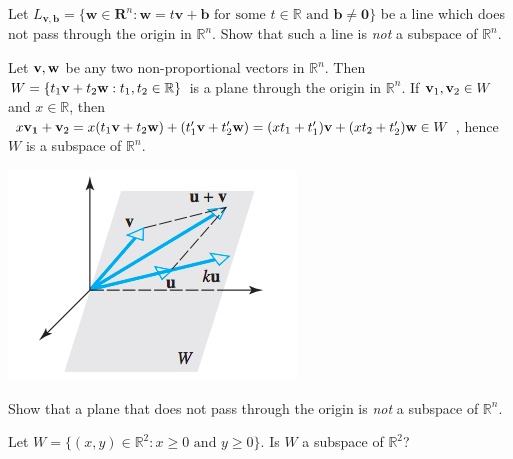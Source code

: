 \documentclass[12pt,letterpaper,reqno]{article}
\numberwithin{equation}{section}
\begin{document}
\begin{exercise}
	Let $L_{\mathbf{v},\mathbf{b}}=\{\mathbf{w} \in \mathbf{R}^n: \mathbf{w}=t\mathbf{v}+\mathbf{b} \text{ for some } t \in \mathbb{R} \text{ and } \mathbf{b} \neq \mathbf{0}\}$ be a line which does not pass through the origin in $\mathbb{R}^n$. Show that such a line is \emph{not} a subspace of $\mathbb{R}^n$.
\end{exercise}

\begin{example}
Let ${\bf v}, {\bf w}$ be any two non-proportional vectors in $\mathbb{R}^n$. Then $W=\{t_1{\bf v}+t_2{\bf w}:t_1,t_2 \in \mathbb{R}\}$ is a plane through the origin in $\mathbb{R}^n$. If ${\bf v}_1, {\bf v}_2 \in W$ and $x \in \mathbb{R}$, then $x{\bf v_1}+{\bf v}_2=x(t_1{\bf v}+t_2{\bf w})+(t_1'{\bf v}+t_2'{\bf w})=(xt_1+t_1'){\bf v}+(xt_2+t_2'){\bf w} \in W$, hence $W$ is a subspace of $\mathbb{R}^n$. 
\end{example}

\begin{center}
	\includegraphics[scale=0.5]{figures_mvc/plane_through_origin_subspace}
\end{center}

\begin{exercise}
Show that a plane that does not pass through the origin is \emph{not} a subspace of $\mathbb{R}^n$.	
\end{exercise}

\begin{exercise}
Let $W=\{(x,y) \in \mathbb{R}^2 : x \geq 0 \text{ and }y \geq 0\}$. Is $W$ a subspace of $\mathbb{R}^2$?	
\end{exercise}
\end{document}
